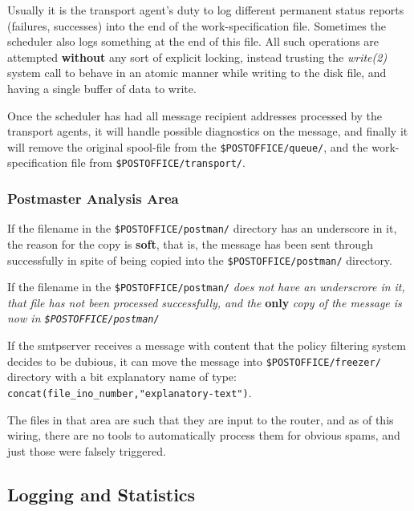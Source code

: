 Usually it is the transport agent's duty to log different permanent status reports 
(failures, successes) into the end of the work-specification file.  
Sometimes the scheduler also logs something at the end of this file.  
All such operations are attempted {\bf without} any sort 
of explicit locking, instead trusting the {\em write(2)\/} system call to 
behave in an atomic manner while writing to the disk file, and 
having a single buffer of data to write.

Once the scheduler has had all message recipient addresses 
processed by the transport agents, it will handle possible
diagnostics on the message, and finally it will remove the
original spool-file from the {\tt \$POSTOFFICE/queue/}, and 
the work-specification file from {\tt \$POSTOFFICE/transport/}.




\subsubsection{Postmaster Analysis Area\label{postmaster_analysis_area}}



If the filename in the {\tt \$POSTOFFICE/postman/} directory has an 
underscore in it, the reason for the copy is {\bf soft}, that is, the 
message has been sent through successfully in spite of being copied into
the {\tt \$POSTOFFICE/postman/} directory.

If the filename in the {\tt \$POSTOFFICE/postman/}
{\em does not have an underscrore in it, that file has not been processed
successfully, and the\/} {\bf only} {\em copy of the message
is now in {\tt \$POSTOFFICE/postman/}\/}

If the  smtpserver  receives a message with content that the policy filtering
system decides to be dubious, it can move the message into
{\tt \$POSTOFFICE/freezer/} directory with a bit explanatory name of type:
{\tt concat(file\_ino\_number,"explanatory-text")}.

The files in that area are such that they are input to the router, and
as of this wiring, there are no tools to automatically process them for
obvious spams, and just those were falsely triggered.




\subsection{\label{Logging_and_Statistics}Logging and Statistics }

